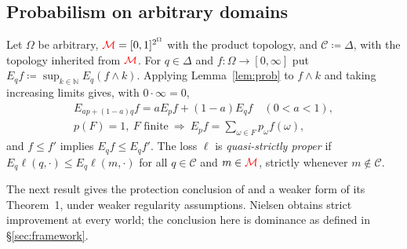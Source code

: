 \documentclass[11pt]{article}
\newcommand{\chg}[1]{{\color{red}#1}}
\theoremstyle{definition}
\theoremstyle{remark}
\newcommand{\M}{\mathcal M}
\newcommand{\C}{\mathcal C}
\begin{document}
\subsection{Probabilism on arbitrary domains}

Let $\Omega$ be arbitrary, $\chg{\M}=[0,1]^{2^\Omega}$ with the product topology, and $\C\coloneqq\Delta$, with the topology inherited from $\chg{\M}$. For $q\in\Delta$ and $f:\Omega\to[0,\infty]$ put $E_qf\coloneqq\sup_{k\in\mathbb N}E_q(f\wedge k)$. Applying Lemma~\ref{lem:prob} to $f\wedge k$ and taking increasing limits gives, with $0\cdot\infty=0$,
\begin{gather*}
E_{ap+(1-a)q}f=aE_pf+(1-a)E_qf\quad(0<a<1),\\
p(F)=1,\ F\text{ finite}\ \Longrightarrow\ E_pf=\textstyle\sum_{\omega\in F}p_\omega f(\omega),
\end{gather*}
and $f\le f'$ implies $E_qf\le E_qf'$. The loss $\ell$ is \emph{quasi-strictly proper} if $E_q\ell(q,\cdot)\le E_q\ell(m,\cdot)$ for all $q\in\C$ and $m\in\chg{\M}$, strictly whenever $m\notin\C$.

\chg{The next result gives the protection conclusion of \cite[Theorem~2]{Nielsen2023} and a weaker form of its Theorem~1, under weaker regularity assumptions. Nielsen obtains strict improvement at every world; the conclusion here is dominance as defined in \S\ref{sec:framework}.}
\end{document}
